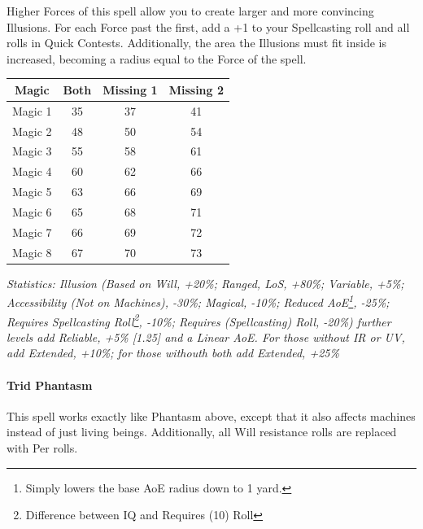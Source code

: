 \begin{multicols*}{3}
	Higher Forces of this spell allow you to create larger and more convincing Illusions. For each Force past the first, add a +1 to your Spellcasting roll and all rolls in Quick Contests. Additionally, the area the Illusions must fit inside is increased, becoming a radius equal to the Force of the spell.
	
	\begin{center}
		\begin{adjustwidth}{-2.5mm}{}
		\begin{tabular}{|c|c|c|c|}
			\hline
			Magic & Both & Missing 1 & Missing 2 \\
			\hline
			\hline
			Magic 1 & 35 & 37 & 41 \\
			Magic 2 & 48 & 50 & 54 \\
			Magic 3 & 55 & 58 & 61 \\
			Magic 4 & 60 & 62 & 66 \\
			Magic 5 & 63 & 66 & 69 \\
			Magic 6 & 65 & 68 & 71 \\
			Magic 7 & 66 & 69 & 72 \\
			Magic 8 & 67 & 70 & 73 \\
			\hline
		\end{tabular}
		\end{adjustwidth}
	\end{center}	
	
	\textcolor{OliveGreen}{\textit{Statistics: Illusion (Based on Will, +20\%; Ranged, LoS, +80\%; Variable, +5\%; Accessibility (Not on Machines), -30\%; Magical, -10\%; Reduced AoE\footnote{Simply lowers the base AoE radius down to 1 yard.}, -25\%; Requires Spellcasting Roll\footnote{Difference between IQ and Requires (10) Roll}, -10\%; Requires (Spellcasting) Roll, -20\%) further levels add Reliable, +5\% [1.25] and a Linear AoE. For those without IR or UV, add Extended, +10\%; for those withouth both add Extended, +25\%}}
	
	\paragraph{Trid Phantasm}
	
	This spell works exactly like Phantasm above, except that it also affects machines instead of just living beings. Additionally, all Will resistance rolls are replaced with Per rolls.
	

\end{multicols*}
